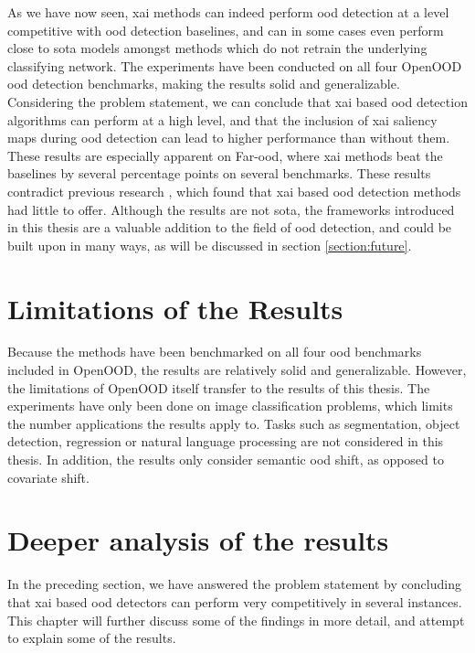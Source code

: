 \documentclass[UKenglish]{uiomasterthesis} %
\theoremstyle{definition}
\begin{document}
As we have now seen, \ac{xai} methods can indeed perform \ac{ood} detection at a level competitive with \ac{ood} detection baselines, and can in some cases even perform close to \ac{sota} models amongst methods which do not retrain the underlying classifying network. The experiments have been conducted on all four OpenOOD \ac{ood} detection benchmarks, making the results solid and generalizable. Considering the problem statement, we can conclude that \ac{xai} based \ac{ood} detection algorithms can perform at a high level, and that the inclusion of \ac{xai} saliency maps during \ac{ood} detection can lead to higher performance than without them. These results are especially apparent on Far-\ac{ood}, where \ac{xai} methods beat the baselines by several percentage points on several benchmarks. These results contradict previous research \cite{martinez}, which found that \ac{xai} based \ac{ood} detection methods had little to offer. Although the results are not \ac{sota}, the frameworks introduced in this thesis are a valuable addition to the field of \ac{ood} detection, and could be built upon in many ways, as will be discussed in section \ref{section:future}.

\section{Limitations of the Results}

Because the methods have been benchmarked on all four \ac{ood} benchmarks included in OpenOOD, the results are relatively solid and generalizable. However, the limitations of OpenOOD itself transfer to the results of this thesis. The experiments have only been done on image classification problems, which limits the number applications the results apply to. Tasks such as segmentation, object detection, regression or natural language processing are not considered in this thesis. In addition, the results only consider semantic \ac{ood} shift, as opposed to covariate shift.

\section{Deeper analysis of the results}

In the preceding section, we have answered the problem statement by concluding that \ac{xai} based \ac{ood} detectors can perform very competitively in several instances. This chapter will further discuss some of the findings in more detail, and attempt to explain some of the results.
\end{document}
